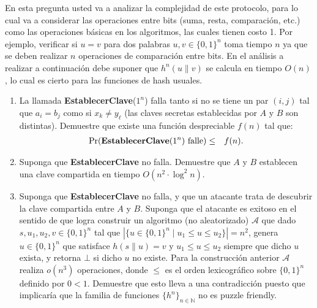 En esta pregunta usted va a analizar la complejidad de este protocolo,
para lo cual va a considerar las operaciones entre bits (suma, resta,
comparación, etc.) como las operaciones básicas en los algoritmos, las
cuales tienen costo 1. Por ejemplo, verificar si $u = v$ para dos
palabras $u, v \in \{0,1\}^n$ toma tiempo $n$ ya que se deben realizar
$n$ operaciones de comparación entre bits. En el análisis a realizar a
continuación debe suponer que $h^n(u \| v)$ se calcula en tiempo
$O(n)$, lo cual es cierto para las funciones de hash usuales.
\begin{enumerate}
\item La llamada {\bf EstablecerClave}($1^n$) falla tanto si no se tiene un par $(i, j)$ tal que $a_i = b_j$ como si $x_k \neq y_\ell$ (las claves secretas establecidas por $A$ y $B$ son distintas). Demuestre que existe una función despreciable $f(n)$ tal que:
\begin{eqnarray*}
\Pr(\text{{\bf EstablecerClave}($1^n$) falle}) & \leq & f(n).
\end{eqnarray*}

\item Suponga que {\bf EstablecerClave} no falla. Demuestre que $A$ y $B$ establecen una clave compartida en tiempo $O(n^2 \cdot \log^2 n)$.

\item Suponga que {\bf EstablecerClave} no falla, y que un atacante trata de descubrir la clave compartida entre $A$ y $B$. Suponga que el atacante es exitoso en el sentido de que logra construir un algoritmo (no aleatorizado) $\mathcal{A}$ que dado $s, u_1, u_2, v \in \{0,1\}^n$ tal que $|\{ u \in \{0, 1\}^n \mid u_1 \leq u \leq u_2 \}| = n^2$, genera $u \in \{0,1\}^n$ que satisface $h(s \| u) = v$ y $u_1 \leq u \leq u_2$ siempre que dicho $u$ exista, y retorna $\bot$ si dicho $u$ no existe. Para la construcción anterior $\mathcal{A}$ realiza $o(n^3)$ operaciones, donde $\leq$ es el orden lexicográfico sobre $\{0,1\}^n$ definido por $0 < 1$. Demuestre que esto lleva a una contradicción puesto que implicaría que la familia de funciones $\{h^n\}_{n \in \mathbb{N}}$ no es puzzle friendly.


\end{enumerate}

\medskip

